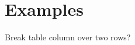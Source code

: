 
\newpage
\section{Examples}
\begin{itemize*}
     \item{} Break table column over two rows?
\end{itemize*}

